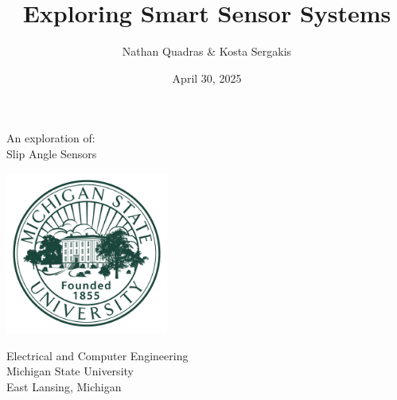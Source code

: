 \documentclass[12pt]{article}
\title{Exploring Smart Sensor Systems}
\author{Nathan Quadras \& Kosta Sergakis}
\date{April 30, 2025}
\makeatletter
\let\runauthor\@author
\let\runtitle\@title
\let\rundate\@date
\makeatother
\begin{document}
    
    \begin{titlepage}
        \begin{center}
            \vspace*{1.5cm}
            
            \textbf{\runtitle}
            
            \vspace{1cm}
            
            An exploration of:\\
            \vspace{0.25cm}
            Slip Angle Sensors
                
            \vspace{1cm}
            
            \textbf{\runauthor}
            
            \vfill  
            
            \vspace{1cm}

            \includegraphics[width=0.4\textwidth]{resources/michigan-state-logo-png-transparent.png}
                
            Electrical and Computer Engineering\\
            Michigan State University\\
            East Lansing, Michigan\\
            \rundate
                
        \end{center}
    
    \end{titlepage}



    \setcounter{secnumdepth}{0} %
    
\end{document}
